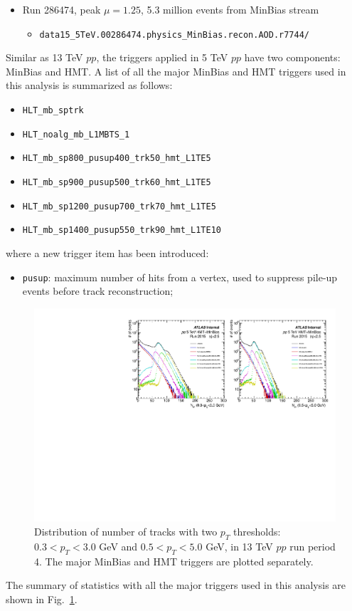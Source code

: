 \begin{itemize}
\item Run 286474, peak $\mu=1.25$, 5.3 million events from MinBias stream
\begin{itemize}[leftmargin=*]
\item[] \verb|data15_5TeV.00286474.physics_MinBias.recon.AOD.r7744/|
\end{itemize}

\end{itemize}

Similar as 13 TeV $pp$, the triggers applied in 5 TeV $pp$ have two components: MinBias and HMT. A list of all the major MinBias and HMT triggers used in this analysis is summarized as follows:
\begin{itemize}
\item \verb|HLT_mb_sptrk|
\item \verb|HLT_noalg_mb_L1MBTS_1|
\item \verb|HLT_mb_sp800_pusup400_trk50_hmt_L1TE5|
\item \verb|HLT_mb_sp900_pusup500_trk60_hmt_L1TE5|
\item \verb|HLT_mb_sp1200_pusup700_trk70_hmt_L1TE5|
\item \verb|HLT_mb_sp1400_pusup550_trk90_hmt_L1TE10|
\end{itemize}
where a new trigger item has been introduced:
\begin{itemize}
\item \verb|pusup|: maximum number of hits from a vertex, used to suppress pile-up events before track reconstruction;
\end{itemize}

\begin{figure}[H]
\centering
\includegraphics[width=.9\linewidth]{figs/sec_evtSlc/trkDis_pp5.pdf}
\caption{Distribution of number of tracks with two $p_{T}$ thresholds: $0.3<p_{T}<3.0$ GeV and $0.5<p_{T}<5.0$ GeV, in 13 TeV $pp$ run period 4. The major MinBias and HMT triggers are plotted separately.}
\label{fig:trkDis_pp5}
\end{figure}
The summary of statistics with all the major triggers used in this analysis are shown in Fig.~\ref{fig:trkDis_pp5}.

